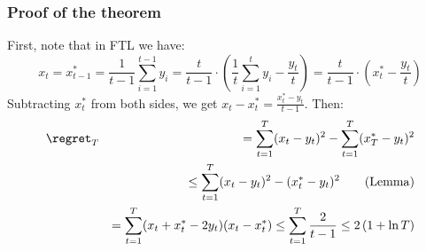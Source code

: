 \documentclass{beamer}
\begin{document}
\begin{frame}
\frametitle{Proof of the theorem}
First, note that in FTL we have:
\[
x_t = x^*_{t-1} = \frac{1}{t-1} \sum_{i=1}^{t-1} y_i = \frac{t}{t-1} \cdot \left(\frac{1}{t} \sum_{i=1}^{t} y_i - \frac{y_t}{t}\right) = \frac{t}{t-1} \cdot \left(x^*_t - \frac{y_t}{t}\right)
\]
Subtracting \(x^*_t\) from both sides, we get \(x_t - x^*_t = \frac{x^*_t - y_t}{t-1}\). Then:
    \begin{eqnarray*}
    	&\regret_T &= \sum_{t=1}^T (x_t-y_t)^2 - \sum_{t=1}^T (x^*_T-y_t)^2\\
	& &\le \sum_{t=1}^T  (x_t-y_t)^2 - (x^*_t-y_t)^2  \quad\quad (\mathrm{Lemma})\\
	& &= \sum_{t=1}^T (x_t + x^*_t - 2y_t)(x_t - x^*_t) \leq \sum_{t=1}^T \frac{2}{t-1} \leq 2\, (1 + \ln T)
     \end{eqnarray*}
\end{frame}
\end{document}
